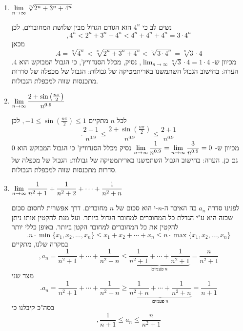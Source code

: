 \begin{enumerate}
\item $\displaystyle{\lim_{n\to\infty}\sqrt[n]{2^n + 3^n + 4^n}}$

\begin{solbox}
    נשים לב כי
    $4^n$
     הוא הגורם הגדול מבין שלושת המחוברים, לכן
    $$,4^n<2^n + 3^n + 4^n< 4^n+4^n+4^n=3\cdot 4^n$$
    מכאן
    $$.4=\sqrt[n]{4^n}<\sqrt[n]{2^n + 3^n + 4^n}<
    \sqrt[n]{3\cdot 4^n}=
    \sqrt[n]{3}\cdot4$$
    מכיוון ש-
    $\displaystyle\lim_{n\to\infty}\sqrt[n]{3}\cdot4=1\cdot4$,
    נסיק, מכלל הסנדוויץ', כי הגבול המבוקש הוא
    $4$.
הערה: בחישוב הגבול השתמשנו באריתמטיקה של גבולות: הגבול של מכפלה של סדרות מתכנסות שווה למכפלת הגבולות.
\end{solbox}

    \item $\displaystyle{\lim_{n\to\infty}\dfrac{2 + \sin \left(\frac{n\pi}{2}\right)}{n^{0.9}}}$
\begin{solbox}
      לכל
      $n$
      מתקיים
    $,-1\le \sin \left(\frac{n\pi}{2}\right) \le 1$
    לכן
    $$.\dfrac{2 - 1}{n^{0.9}}\leq\dfrac{2 + \sin \left(\frac{n\pi}{2}\right)}{n^{0.9}}\leq\dfrac{2 + 1}{n^{0.9}}$$
    מכיוון ש-
    $\displaystyle\lim_{n\to\infty}\dfrac{1}{n^{0.9}}=\displaystyle\lim_{n\to\infty}\dfrac{3}{n^{0.9}}=0$
    נסיק מכלל הסנדוויץ' כי הגבול המבוקש הוא
    $0$
    גם כן.
הערה: בחישוב הגבול השתמשנו באריתמטיקה של גבולות: הגבול של מכפלה של סדרות מתכנסות שווה למכפלת הגבולות.
\end{solbox}
    \item $\displaystyle{\lim_{n\to\infty}\dfrac{1}{n^2 + 1} + \dfrac{1}{n^2 + 2} +\cdots + \dfrac{1}{n^2 + n}}$
\begin{solbox}
       לפנינו סדרה
       $a_n$
       בה האיבר ה-$n$-י הוא סכום של
    $n$
    מחוברים. דרך אפשרית לחסום סכום שכזה היא ע"י הגדלת כל המחוברים למחובר הגדול ביותר.
    ועל מנת להקטין אותו ניתן להקטין את כל המחוברים למחובר הקטן ביותר.
    באופן כללי יותר
    $$.n\cdot\min\{x_1,x_2,\ldots,x_n\}\leq x_1+x_2+\cdots+x_n\leq n\cdot\max\{x_1,x_2,\ldots,x_n\}$$
    במקרה שלנו,
מתקיים
    $$,a_n
    =\dfrac{1}{n^2 + 1} +\cdots + \dfrac{1}{n^2 + n}\leq\underbrace{\frac{1}{n^2+1}
    +\cdots+\frac{1}{n^2+1}}_{םימעפ  \ n}=\frac{n}{n^2+1}$$
    מצד שני
    $$.a_n=\dfrac{1}{n^2 + 1} + \cdots + \dfrac{1}{n^2 + n}\geq\underbrace{\dfrac{1}{n^2 + n} + \cdots + \dfrac{1}{n^2 + n}}_{םימעפ  \ n}=\frac{1}{n+1}$$
    בסה"כ קיבלנו כי
    $$,\frac{1}{n+1}\leq a_n\leq\frac{n}{n^2+1}$$

\end{solbox}
\end{enumerate}
